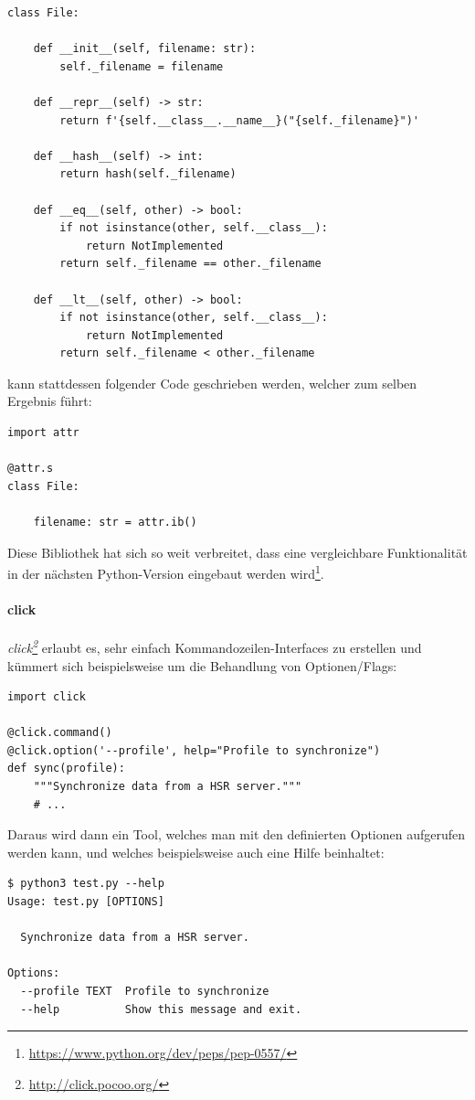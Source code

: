 \documentclass[a4paper]{article}
\newcommand{\tool}[2]{\emph{#1\footnote{\url{#2}}}}
\begin{document}
\begin{verbatim}
class File:

    def __init__(self, filename: str):
        self._filename = filename

    def __repr__(self) -> str:
        return f'{self.__class__.__name__}("{self._filename}")'

    def __hash__(self) -> int:
        return hash(self._filename)

    def __eq__(self, other) -> bool:
        if not isinstance(other, self.__class__):
            return NotImplemented
        return self._filename == other._filename

    def __lt__(self, other) -> bool:
        if not isinstance(other, self.__class__):
            return NotImplemented
        return self._filename < other._filename
\end{verbatim}

kann stattdessen folgender Code geschrieben werden, welcher zum selben Ergebnis führt:

\begin{verbatim}
import attr

@attr.s
class File:

    filename: str = attr.ib()
\end{verbatim}

Diese Bibliothek hat sich so weit verbreitet, dass eine vergleichbare
Funktionalität in der nächsten Python-Version eingebaut werden wird\footnote{\url{https://www.python.org/dev/peps/pep-0557/}}.

\paragraph{click}

\tool{click}{http://click.pocoo.org/} erlaubt es, sehr einfach
Kommandozeilen-Interfaces zu erstellen und kümmert sich beispielsweise um die
Behandlung von Optionen/Flags:

\begin{verbatim}
import click

@click.command()
@click.option('--profile', help="Profile to synchronize")
def sync(profile):
    """Synchronize data from a HSR server."""
    # ...
\end{verbatim}

Daraus wird dann ein Tool, welches man mit den definierten Optionen aufgerufen
werden kann, und welches beispielsweise auch eine Hilfe beinhaltet:

\begin{verbatim}
$ python3 test.py --help
Usage: test.py [OPTIONS]

  Synchronize data from a HSR server.

Options:
  --profile TEXT  Profile to synchronize
  --help          Show this message and exit.
\end{verbatim}
\end{document}
